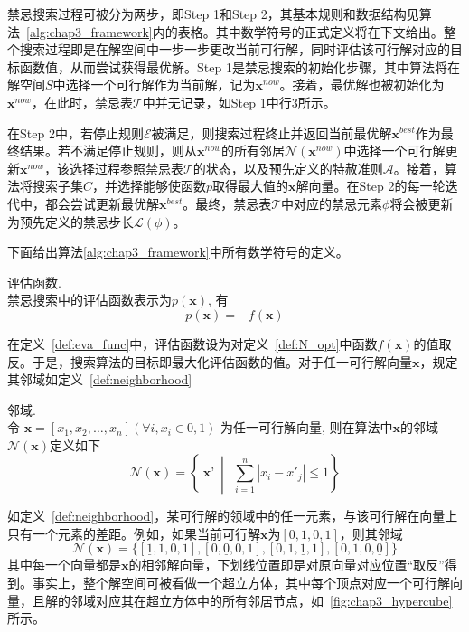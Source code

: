 禁忌搜索过程可被分为两步，即Step 1和Step 2，其基本规则和数据结构见算法~\ref{alg:chap3_framework}内的表格。其中数学符号的正式定义将在下文给出。整个搜索过程即是在解空间中一步一步更改当前可行解，同时评估该可行解对应的目标函数值，从而尝试获得最优解。Step 1是禁忌搜索的初始化步骤，其中算法将在解空间$S$中选择一个可行解作为当前解，记为$\bm{x}^{now}$。接着，最优解也被初始化为$\bm{x}^{now}$，在此时，禁忌表$\mathcal{T}$中并无记录，如Step 1中行3所示。

在Step 2中，若停止规则$\mathcal{E}$被满足，则搜索过程终止并返回当前最优解$\bm{x}^{best}$作为最终结果。若不满足停止规则，则从$\bm{x}^{now}$的所有邻居$\mathcal{N}(\bm{x}^{now})$中选择一个可行解更新$\bm{x}^{now}$，该选择过程参照禁忌表$\mathcal{T}$的状态，以及预先定义的特赦准则$\mathcal{A}$。接着，算法将搜索子集$C$，并选择能够使函数$p$取得最大值的$\bm{x}$解向量。在Step 2的每一轮迭代中，都会尝试更新最优解$\bm{x}^{best}$。最终，禁忌表$\mathcal{T}$中对应的禁忌元素$\phi$将会被更新为预先定义的禁忌步长$\mathcal{L}(\phi)$。

下面给出算法\ref{alg:chap3_framework}中所有数学符号的定义。

\begin{definition}评估函数.\\
禁忌搜索中的评估函数表示为$p(\textbf{x})$, 有
\[
p(\textbf{x})=-f(\textbf{x})
\]
\label{def:eva_func}
\end{definition}

在定义~\ref{def:eva_func}中，评估函数设为对定义~\ref{def:N_opt}中函数$f(\bm{x})$的值取反。于是，搜索算法的目标即最大化评估函数的值。对于任一可行解向量$\bm{x}$，规定其邻域如定义~\ref{def:neighborhood}

\begin{definition}邻域.\\
令 $\textbf{x}=[x_1,x_2,\ldots,x_n]$$(\forall i, x_i\in{0,1})$ 为任一可行解向量, 则在算法中$\textbf{x}$的邻域$\mathcal{N}(\bm{x})$定义如下
\begin{equation}
\mathcal{N}(\textbf{x})=\left\{~\textbf{x'}~\middle|~~\sum_{i=1}^{n}\left| x_i- x'_j\right|\leq 1\right\}
\end{equation}
\label{def:neighborhood}
\end{definition}

如定义~\ref{def:neighborhood}，某可行解的领域中的任一元素，与该可行解在向量上只有一个元素的差距。例如，如果当前可行解$\bm{x}$为$[0,1,0,1]$，则其邻域
\[
\mathcal{N}(\textbf{x})=\{[\underline{1},1,0,1],[0,\underline{0},0,1],[0,1,\underline{1},1],[0,1,0,\underline{0}]\}
\]
其中每一个向量都是$\bm{x}$的相邻解向量，下划线位置即是对原向量对应位置“取反”得到。事实上，整个解空间可被看做一个超立方体，其中每个顶点对应一个可行解向量，且解的邻域对应其在超立方体中的所有邻居节点，如\figurename~\ref{fig:chap3_hypercube}所示。

